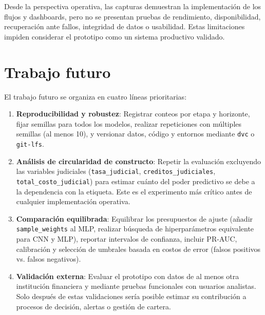 Desde la perspectiva operativa, las capturas demuestran la implementación de los flujos y dashboards, pero no se presentan pruebas de rendimiento, disponibilidad, recuperación ante fallos, integridad de datos o usabilidad. Estas limitaciones impiden considerar el prototipo como un sistema productivo validado.

\section{Trabajo futuro}

El trabajo futuro se organiza en cuatro líneas prioritarias:

\begin{enumerate}
    \item \textbf{Reproducibilidad y robustez}: Registrar conteos por etapa y horizonte, fijar semillas para todos los modelos, realizar repeticiones con múltiples semillas (al menos 10), y versionar datos, código y entornos mediante \texttt{dvc} o \texttt{git-lfs}.
    
    \item \textbf{Análisis de circularidad de constructo}: Repetir la evaluación excluyendo las variables judiciales (\texttt{tasa\_judicial}, \texttt{creditos\_judiciales}, \texttt{total\_costo\_judicial}) para estimar cuánto del poder predictivo se debe a la dependencia con la etiqueta. Este es el experimento más crítico antes de cualquier implementación operativa.
    
    \item \textbf{Comparación equilibrada}: Equilibrar los presupuestos de ajuste (añadir \texttt{sample\_weights} al MLP, realizar búsqueda de hiperparámetros equivalente para CNN y MLP), reportar intervalos de confianza, incluir PR-AUC, calibración y selección de umbrales basada en costos de error (falsos positivos vs. falsos negativos).
    
    \item \textbf{Validación externa}: Evaluar el prototipo con datos de al menos otra institución financiera y mediante pruebas funcionales con usuarios analistas. Solo después de estas validaciones sería posible estimar su contribución a procesos de decisión, alertas o gestión de cartera.
\end{enumerate}